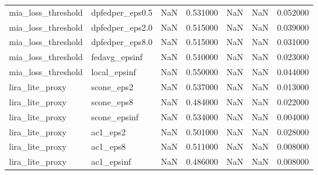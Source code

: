 \begin{tabular}{lllrrrr}
mia_loss_threshold & dpfedper_eps0.5 & NaN & 0.531000 & NaN & NaN & 0.052000 \\
mia_loss_threshold & dpfedper_eps2.0 & NaN & 0.515000 & NaN & NaN & 0.039000 \\
mia_loss_threshold & dpfedper_eps8.0 & NaN & 0.515000 & NaN & NaN & 0.031000 \\
mia_loss_threshold & fedavg_epsinf & NaN & 0.510000 & NaN & NaN & 0.023000 \\
mia_loss_threshold & local_epsinf & NaN & 0.550000 & NaN & NaN & 0.044000 \\
lira_lite_proxy & scone_eps2 & NaN & 0.537000 & NaN & NaN & 0.013000 \\
lira_lite_proxy & scone_eps8 & NaN & 0.484000 & NaN & NaN & 0.022000 \\
lira_lite_proxy & scone_epsinf & NaN & 0.534000 & NaN & NaN & 0.004000 \\
lira_lite_proxy & ac1_eps2 & NaN & 0.501000 & NaN & NaN & 0.028000 \\
lira_lite_proxy & ac1_eps8 & NaN & 0.511000 & NaN & NaN & 0.008000 \\
lira_lite_proxy & ac1_epsinf & NaN & 0.486000 & NaN & NaN & 0.008000 \\
\bottomrule
\end{tabular}
